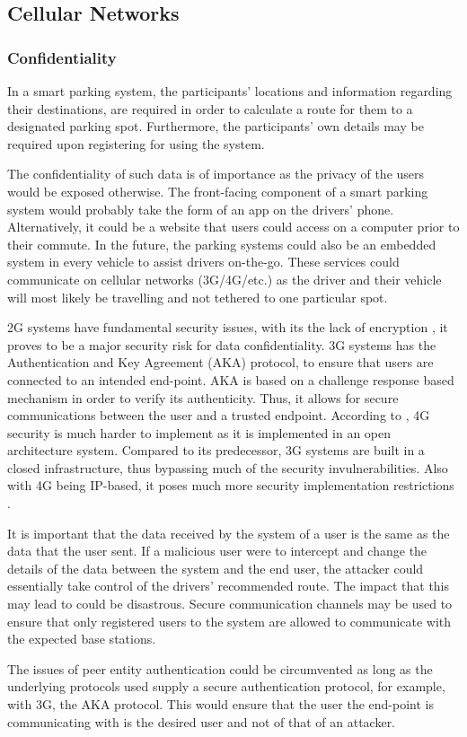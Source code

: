 \subsection{Cellular Networks}
\subsubsection{Confidentiality}
In a smart parking system, the participants' locations and information regarding their destinations, are required in order to calculate a route for them to a designated parking spot. Furthermore, the participants' own details may be required upon registering for using the system.

The confidentiality of such data is of importance as the privacy of the users would be exposed otherwise. The front-facing component of a smart parking system would probably take the form of an app on the drivers' phone. Alternatively, it could be a website that users could access on a computer prior to their commute. In the future, the parking systems could also be an embedded system in every vehicle to assist drivers on-the-go. These services could communicate on cellular networks (3G/4G/etc.) as the driver and their vehicle will most likely be travelling and not tethered to one particular spot.

2G systems have fundamental security issues, with its the lack of encryption \citep{simate2013evaluation}, it proves to be a major security risk for data confidentiality. 3G systems has the Authentication and Key Agreement (AKA) protocol, to ensure that users are connected to an intended end-point. AKA is based on a challenge response based mechanism in order to verify its authenticity. Thus, it allows for secure communications between the user and a trusted endpoint. According to \citep{shirbhate2012providing}, 4G security is much harder to implement as it is implemented in an open architecture system. Compared to its predecessor, 3G systems are built in a closed infrastructure, thus bypassing much of the security invulnerabilities. Also with 4G being IP-based, it poses much more security implementation restrictions \citep{park2007survey}.

It is important that the data received by the system of a user is the same as the data that the user sent. If a malicious user were to intercept and change the details of the data between the system and the end user, the attacker could essentially take control of the drivers' recommended route. The impact that this may lead to could be disastrous. Secure communication channels may be used to ensure that only registered users to the system are allowed to communicate with the expected base stations. 

The issues of peer entity authentication could be circumvented as long as the underlying protocols used supply a secure authentication protocol, for example, with 3G, the AKA protocol. This would ensure that the user the end-point is communicating with is the desired user and not of that of an attacker.